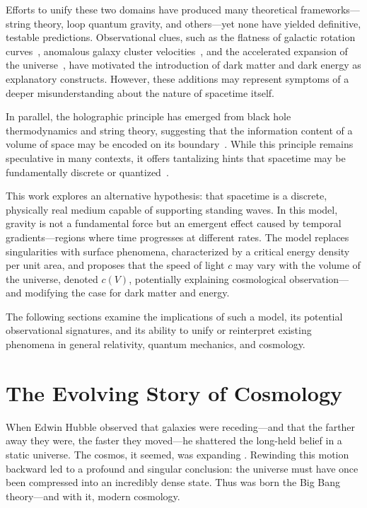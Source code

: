 \documentclass[12pt]{article}
\begin{document}
Efforts to unify these two domains have produced many theoretical frameworks---string theory, loop quantum gravity, and others---yet none have yielded definitive, testable predictions. Observational clues, such as the flatness of galactic rotation curves~\cite{rubin1978}, anomalous galaxy cluster velocities~\cite{zwicky1933}, and the accelerated expansion of the universe~\cite{perlmutter1999, riess1998, schmidt1998}, have motivated the introduction of dark matter and dark energy as explanatory constructs. However, these additions may represent symptoms of a deeper misunderstanding about the nature of spacetime itself.

In parallel, the holographic principle has emerged from black hole thermodynamics and string theory, suggesting that the information content of a volume of space may be encoded on its boundary~\cite{thooft1993}. While this principle remains speculative in many contexts, it offers tantalizing hints that spacetime may be fundamentally discrete or quantized~\cite{thooft1993, maldacena1999}.

This work explores an alternative hypothesis: that spacetime is a discrete, physically real medium capable of supporting standing waves. In this model, gravity is not a fundamental force but an emergent effect caused by temporal gradients---regions where time progresses at different rates. The model replaces singularities with surface phenomena, characterized by a critical energy density per unit area, and proposes that the speed of light \( c \) may vary with the volume of the universe, denoted \( c(V) \), potentially explaining cosmological observation---and modifying the case for dark matter and energy.

The following sections examine the implications of such a model, its potential observational signatures, and its ability to unify or reinterpret existing phenomena in general relativity, quantum mechanics, and cosmology.


\section{The Evolving Story of Cosmology}
When Edwin Hubble observed that galaxies were receding---and that the farther away they were, the faster they moved---he shattered the long-held belief in a static universe. The cosmos, it seemed, was expanding \citep{hubble1929}. Rewinding this motion backward led to a profound and singular conclusion: the universe must have once been compressed into an incredibly dense state. Thus was born the Big Bang theory---and with it, modern cosmology.
\end{document}
